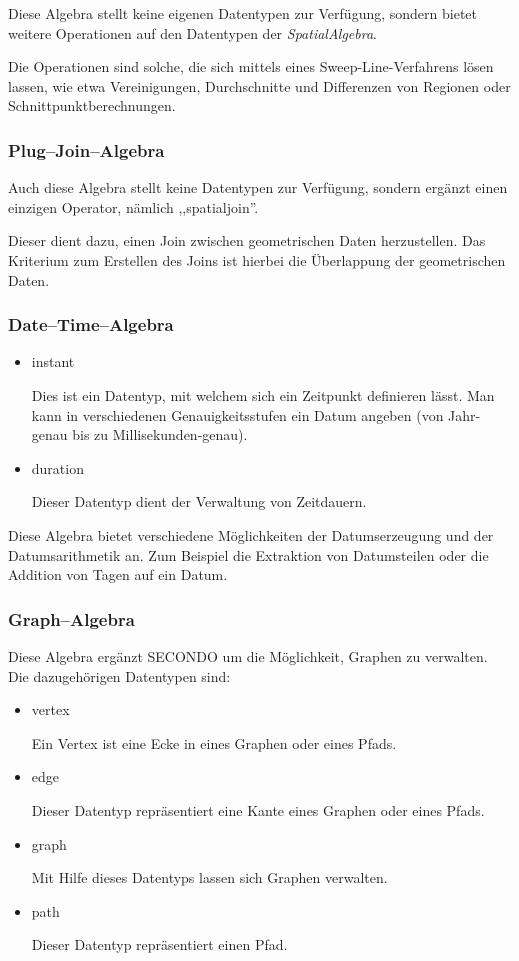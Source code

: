 Diese Algebra stellt keine eigenen Datentypen zur Verfügung, sondern bietet weitere Operationen auf den Datentypen der \textit{SpatialAlgebra}.

Die Operationen sind solche, die sich mittels eines Sweep-Line-Verfahrens lösen lassen, wie etwa Vereinigungen, Durchschnitte und Differenzen von Regionen oder Schnittpunktberechnungen.

\subsubsection{Plug--Join--Algebra}

Auch diese Algebra stellt keine Datentypen zur Verfügung, sondern ergänzt einen einzigen Operator, nämlich ,,spatialjoin''.

Dieser dient dazu, einen Join zwischen geometrischen Daten herzustellen. Das Kriterium zum Erstellen des Joins ist hierbei die Überlappung der geometrischen Daten. 

\subsubsection{Date--Time--Algebra}
\begin{itemize}
\item instant

Dies ist ein Datentyp, mit welchem sich ein Zeitpunkt definieren lässt. Man kann in verschiedenen Genauigkeitsstufen ein Datum angeben (von Jahr-genau bis zu Millisekunden-genau).
\item duration

Dieser Datentyp dient der Verwaltung von Zeitdauern.
\end{itemize}

Diese Algebra bietet verschiedene Möglichkeiten der Datumserzeugung und der Datumsarithmetik an. Zum Beispiel die Extraktion von Datumsteilen oder die Addition von Tagen auf ein Datum.

\subsubsection{Graph--Algebra}

Diese Algebra ergänzt SECONDO um die Möglichkeit, Graphen zu verwalten. Die dazugehörigen Datentypen sind:

\begin{itemize}
\item vertex

Ein Vertex ist eine Ecke in eines Graphen oder eines Pfads.
\item edge

Dieser Datentyp repräsentiert eine Kante eines Graphen oder eines Pfads.
\item graph

Mit Hilfe dieses Datentyps lassen sich Graphen verwalten.
\item path

Dieser Datentyp repräsentiert einen Pfad.
\end{itemize}

